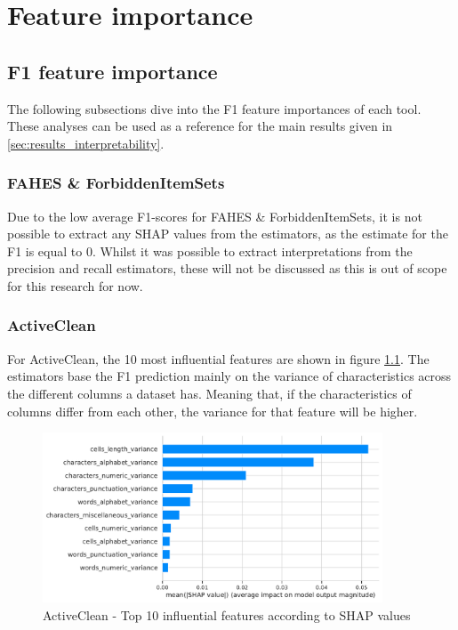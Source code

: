 \chapter{Feature importance} %
\label{app:feature_importances}
\section{F1 feature importance}
The following subsections dive into the F1 feature importances of each tool. These analyses can be used as a reference for the main results given in \autoref{sec:results_interpretability}.

\label{appsec:f1_feature_importance}
\subsection{FAHES \& ForbiddenItemSets}
Due to the low average F1-scores for FAHES \& ForbiddenItemSets, it is not possible to extract any SHAP values from the estimators, as the estimate for the F1 is equal to 0. Whilst it was possible to extract interpretations from the precision and recall estimators, these will not be discussed as this is out of scope for this research for now.

\subsection{ActiveClean}
For ActiveClean, the 10 most influential features are shown in figure \ref{fig:most_impact_features_activeclean}. The estimators base the F1 prediction mainly on the variance of characteristics across the different columns a dataset has. Meaning that, if the characteristics of columns differ from each other, the variance for that feature will be higher.

\begin{figure}[H]
    \centering
    \includegraphics[width=0.9\textwidth]{thesis/Figures/RQ4/Shap_cell_f1_ActiveClean.pdf}
    \caption{ActiveClean - Top 10 influential features according to SHAP values}
    \label{fig:most_impact_features_activeclean}
\end{figure}

